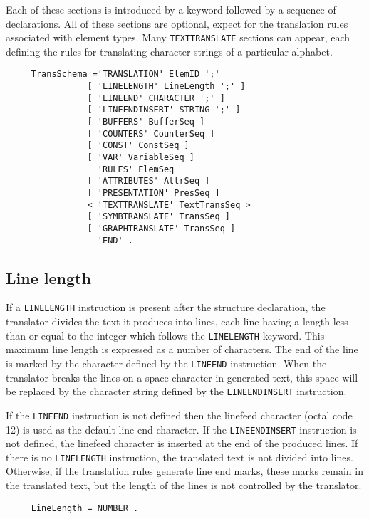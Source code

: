 Each of these sections is introduced by a keyword followed by a
sequence of declarations.  All of these sections are optional, expect
for the translation rules associated with element types.  Many {\tt TEXTTRANSLATE}
sections can appear, each defining the rules for translating character
strings of a particular alphabet.

\begin{verbatim}
     TransSchema ='TRANSLATION' ElemID ';'
                [ 'LINELENGTH' LineLength ';' ]
                [ 'LINEEND' CHARACTER ';' ]
                [ 'LINEENDINSERT' STRING ';' ]
                [ 'BUFFERS' BufferSeq ]
                [ 'COUNTERS' CounterSeq ]
                [ 'CONST' ConstSeq ]
                [ 'VAR' VariableSeq ]
                  'RULES' ElemSeq
                [ 'ATTRIBUTES' AttrSeq ]
                [ 'PRESENTATION' PresSeq ]
                < 'TEXTTRANSLATE' TextTransSeq >
                [ 'SYMBTRANSLATE' TransSeq ]
                [ 'GRAPHTRANSLATE' TransSeq ]
                  'END' .
\end{verbatim}

\subsection{Line length}
\label{linelength}

If a {\tt LINELENGTH} instruction is present after the structure
declaration, the translator divides the text it produces into lines,
each line having a length less than or equal to the integer which
follows the {\tt LINELENGTH} keyword.  This maximum line length is
expressed as a number of characters.  The end of the line is marked by
the character defined by the {\tt LINEEND} instruction.  When the
translator breaks the lines on a space character in generated text,
this space will be replaced by the character string defined by the
{\tt LINEENDINSERT} instruction.

If the {\tt LINEEND} instruction is not defined then the linefeed
character (octal code 12) is used as the default line end character.
If the {\tt LINEENDINSERT} instruction is not defined, the linefeed
character is inserted at the end of the produced lines.  If there is
no {\tt LINELENGTH} instruction, the translated text is not divided into
lines.  Otherwise, if the translation rules generate line end marks,
these marks remain in the translated text, but the length of the lines
is not controlled by the translator.

\begin{verbatim}
     LineLength = NUMBER .
\end{verbatim}

